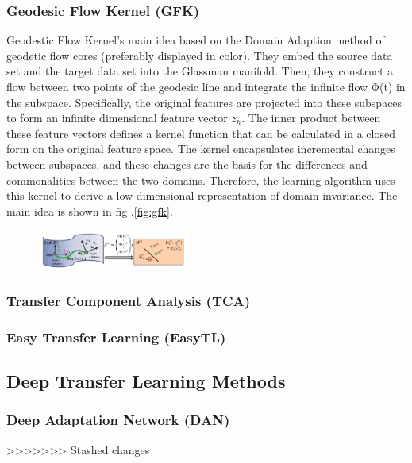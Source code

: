\documentclass[conference]{IEEEtran}
\begin{document}
\subsubsection{Geodesic Flow Kernel (GFK)}
Geodestic Flow Kernel's\cite{gong2012geodesic} main idea based on the Domain Adaption method of geodetic flow cores (preferably displayed in color). They embed the source data set and the target data set into the Glassman manifold. Then, they construct a flow between two points of the geodesic line and integrate the infinite flow Φ(t) in the subspace. Specifically, the original features are projected into these subspaces to form an infinite dimensional feature vector $z_h$. The inner product between these feature vectors defines a kernel function that can be calculated in a closed form on the original feature space. The kernel encapsulates incremental changes between subspaces, and these changes are the basis for the differences and commonalities between the two domains. Therefore, the learning algorithm uses this kernel to derive a low-dimensional representation of domain invariance.
The main idea is shown in fig .\ref{fig:gfk}.
\begin{center}
	\begin{figure}[htbp]
		\centering
		\includegraphics[width=5cm]{img/gfk.png}
		\caption{}
	\end{figure}\label{fig:gfk}
\end{center}

\subsubsection{Transfer Component Analysis (TCA)}



\subsubsection{Easy Transfer Learning (EasyTL)}

\subsection{Deep Transfer Learning Methods}

\subsubsection{Deep Adaptation Network (DAN)}
>>>>>>> Stashed changes
\end{document}
